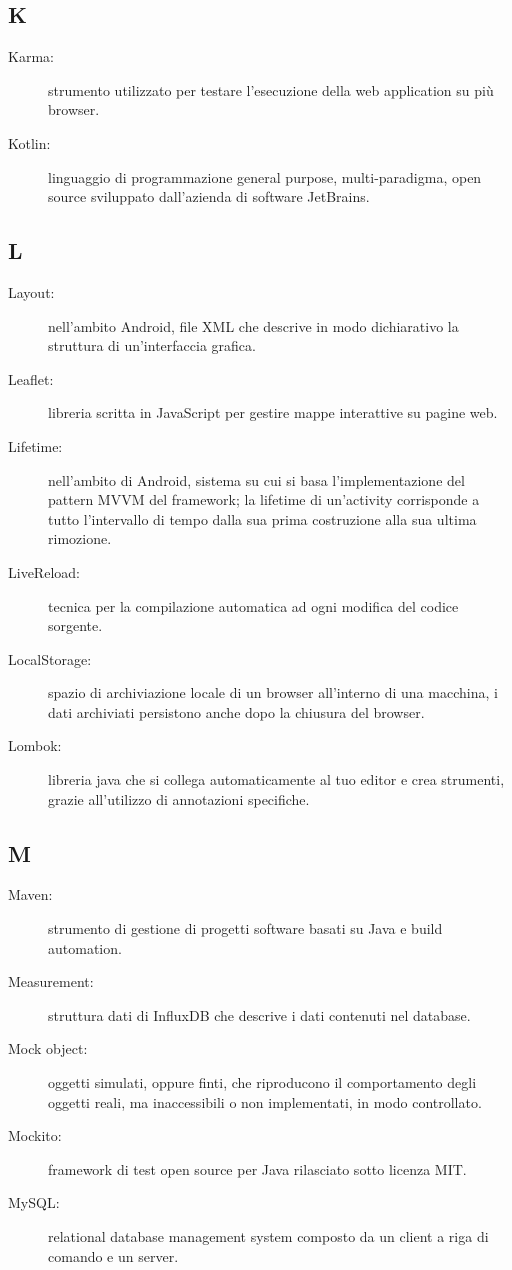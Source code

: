 \documentclass[../manuale-manutentore.tex]{subfiles}
\begin{document}
\subsection{K}

\begin{description}
    \item[Karma:] strumento utilizzato per testare l'esecuzione della web application su più browser.
    \item[Kotlin:] linguaggio di programmazione general purpose, multi-paradigma, open source sviluppato dall'azienda di software JetBrains.
\end{description}

\subsection{L}

\begin{description}
    \item[Layout:] nell'ambito Android, file XML che descrive in modo dichiarativo la struttura di un'interfaccia grafica.
    \item[Leaflet:] libreria scritta in JavaScript per gestire mappe interattive su pagine web.
    \item[Lifetime:] nell'ambito di Android, sistema su cui si basa l'implementazione del pattern MVVM del framework; la lifetime di un'activity corrisponde a tutto l'intervallo di tempo dalla sua prima costruzione alla sua ultima rimozione.
    \item[LiveReload:] tecnica per la compilazione automatica ad ogni modifica del codice sorgente.
    \item[LocalStorage:] spazio di archiviazione locale di un browser all'interno di una macchina, i dati archiviati persistono anche dopo la chiusura del browser.
    \item[Lombok:] libreria java che si collega automaticamente al tuo editor e crea strumenti, grazie all'utilizzo di annotazioni specifiche.
\end{description}

\subsection{M}

\begin{description}
    \item[Maven:] strumento di gestione di progetti software basati su Java e build automation.
    \item[Measurement:] struttura dati di InfluxDB che descrive i dati contenuti nel database.
    \item[Mock object:] oggetti simulati, oppure finti, che riproducono il comportamento degli oggetti reali, ma inaccessibili o non implementati, in modo controllato.
    \item[Mockito:] framework di test open source per Java rilasciato sotto licenza MIT\@.
    \item[MySQL:] relational database management system composto da un client a riga di comando e un server.
\end{description}
\end{document}
